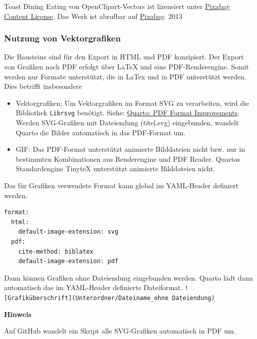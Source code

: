 \documentclass[
  letterpaper,
  DIV=11]{scrartcl}
\begin{document}
Toast Dining Eating von OpenClipart-Vectors ist lizensiert unter
\href{https://pixabay.com/service/license-summary/}{Pixabay Content
License}. Das Werk ist abrufbar auf
\href{https://pixabay.com/vectors/toast-dining-eating-event-festive-153723/}{Pixabay}.
2013

\subsubsection{Nutzung von
Vektorgrafiken}\label{nutzung-von-vektorgrafiken}

Die Bausteine sind für den Export in HTML und PDF konzipiert. Der Export
von Grafiken nach PDF erfolgt über LaTeX und eine PDF-Renderengine.
Somit werden nur Formate unterstützt, die in LaTex und in PDF
unterstützt werden. Dies betrifft insbesondere

\begin{itemize}
\item
  Vektorgrafiken: Um Vektorgrafiken im Format SVG zu verarbeiten, wird
  die Bibliothek \texttt{Librsvg} benötigt. Siehe:
  \href{https://quarto.org/docs/prerelease/1.3/pdf.html}{Quarto: PDF
  Format Improvements}. Werden SVG-Grafiken mit Dateiendung (titel.svg)
  eingebunden, wandelt Quarto die Bilder automatisch in das PDF-Format
  um.
\item
  GIF: Das PDF-Format unterstützt animierte Bilddateien nicht bzw. nur
  in bestimmten Kombinationen aus Renderengine und PDF Reader. Quartos
  Standardengine TinyteX unterstützt animierte Bilddateien nicht.
\end{itemize}

Das für Grafiken verwendete Format kann global im YAML-Header definiert
werden.

\begin{verbatim}
format:
  html:
    default-image-extension: svg
  pdf:
    cite-method: biblatex
    default-image-extension: pdf
\end{verbatim}

Dann können Grafiken ohne Dateiendung eingebunden werden. Quarto lädt
dann automatisch das im YAML-Header definierte Dateiformat.
\texttt{!{[}Grafiküberschrift{]}(Unterordner/Dateiname\_ohne\ Dateiendung)}

\begin{tcolorbox}[enhanced jigsaw, opacityback=0, toprule=.15mm, left=2mm, arc=.35mm, rightrule=.15mm, colback=white, colframe=quarto-callout-warning-color-frame, bottomrule=.15mm, breakable, leftrule=.75mm]
\begin{minipage}[t]{5.5mm}
\textcolor{quarto-callout-warning-color}{\faExclamationTriangle}
\end{minipage}%
\begin{minipage}[t]{\textwidth - 5.5mm}

\vspace{-3mm}\textbf{Hinweis}\vspace{3mm}

Auf GitHub wandelt ein Skript alle SVG-Grafiken automatisch in PDF um.

\end{minipage}%
\end{tcolorbox}
\end{document}
